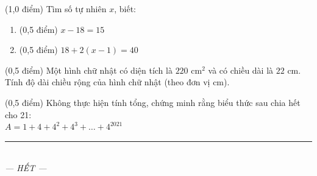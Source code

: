 \documentclass[12pt,a4paper]{article}
\begin{document}
\begin{ex} (1,0 điểm)
Tìm số tự nhiên $x$, biết:
\begin{enumerate}[label=\textbf{\alph*)}, leftmargin=0.8cm, itemsep=2pt]
\item (0,5 điểm) $x - 18 = 15$
\item (0,5 điểm) $18 + 2(x - 1) = 40$
\end{enumerate}
\end{ex}
\vspace{1.5mm}

\begin{ex} (0,5 điểm)
Một hình chữ nhật có diện tích là $220\text{ cm}^2$ và có chiều dài là $22\text{ cm}$. Tính độ dài chiều rộng của hình chữ nhật (theo đơn vị $\text{cm}$).
\end{ex}
\vspace{1.5mm}

\begin{ex} (0,5 điểm)
Không thực hiện tính tổng, chứng minh rằng biểu thức sau chia hết cho 21:\\$A = 1 + 4 + 4^2 + 4^3 + \dots + 4^{2021}$
\end{ex}
\vspace{1.5mm}


\begin{center}
\rule{4cm}{0.4pt}\\
\textit{--- HẾT ---}
\end{center}
\end{document}
